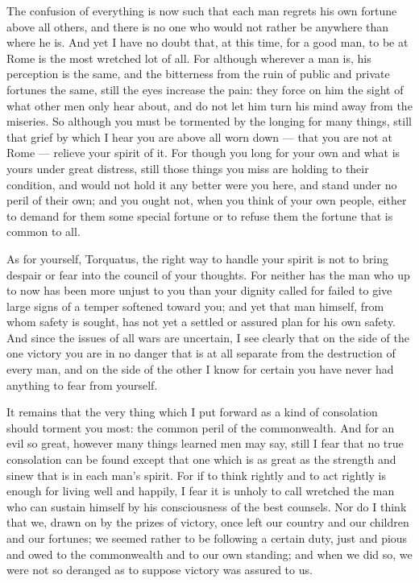 

 The confusion of everything is now such that each man regrets his own fortune above all others, and there is no one who would not rather be anywhere than where he is. And yet I have no doubt that, at this time, for a good man, to be at Rome is the most wretched lot of all. For although wherever a man is, his perception is the same, and the bitterness from the ruin of public and private fortunes the same, still the eyes increase the pain: they force on him the sight of what other men only hear about, and do not let him turn his mind away from the miseries. So although you must be tormented by the longing for many things, still that grief by which I hear you are above all worn down --- that you are not at Rome --- relieve your spirit of it. For though you long for your own and what is yours under great distress, still those things you miss are holding to their condition, and would not hold it any better were you here, and stand under no peril of their own; and you ought not, when you think of your own people, either to demand for them some special fortune or to refuse them the fortune that is common to all.

 As for yourself, Torquatus, the right way to handle your spirit is not to bring despair or fear into the council of your thoughts. For neither has the man who up to now has been more unjust to you than your dignity called for failed to give large signs of a temper softened toward you; and yet that man himself, from whom safety is sought, has not yet a settled or assured plan for his own safety. And since the issues of all wars are uncertain, I see clearly that on the side of the one victory you are in no danger that is at all separate from the destruction of every man, and on the side of the other I know for certain you have never had anything to fear from yourself.

 It remains that the very thing which I put forward as a kind of consolation should torment you most: the common peril of the commonwealth. And for an evil so great, however many things learned men may say, still I fear that no true consolation can be found except that one which is as great as the strength and sinew that is in each man's spirit. For if to think rightly and to act rightly is enough for living well and happily, I fear it is unholy to call wretched the man who can sustain himself by his consciousness of the best counsels. Nor do I think that we, drawn on by the prizes of victory, once left our country and our children and our fortunes; we seemed rather to be following a certain duty, just and pious and owed to the commonwealth and to our own standing; and when we did so, we were not so deranged as to suppose victory was assured to us.


